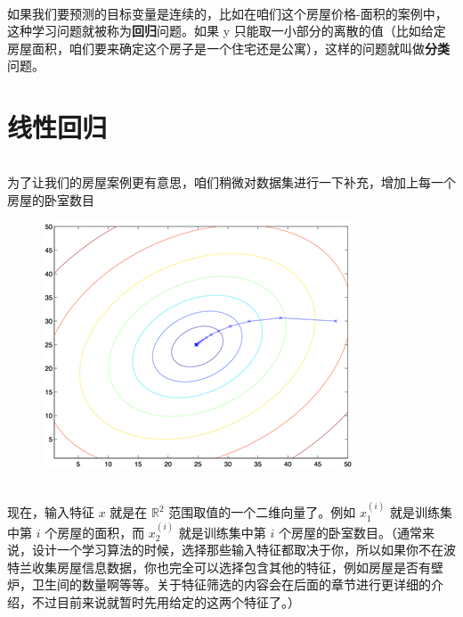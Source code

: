 \documentclass[UTF8]{ctexart}
\begin{document}
	\paragraph{}
		如果我们要预测的目标变量是连续的，比如在咱们这个房屋价格-面积的案例中，这种学习问题就被称为\textbf{回归}问题。如果 y 只能取一小部分的离散的值（比如给定房屋面积，咱们要来确定这个房子是一个住宅还是公寓），这样的问题就叫做\textbf{分类}问题。
	
	\clearpage
	
	\part{线性回归}
	
	\paragraph{}
		为了让我们的房屋案例更有意思，咱们稍微对数据集进行一下补充，增加上每一个房屋的卧室数目
	
	\begin{figure}[h]
		\centering
		\includegraphics{images/screenshot004}
	\end{figure}
	
	\paragraph{}
		现在，输入特征 $ x $ 就是在 $ \mathbb{R}^{2} $ 范围取值的一个二维向量了。例如 $x _{1}^{(i)}$ 就是训练集中第 $i$ 个房屋的面积，而 $x_{2}^{(i)}$ 就是训练集中第 $i$ 个房屋的卧室数目。（通常来说，设计一个学习算法的时候，选择那些输入特征都取决于你，所以如果你不在波特兰收集房屋信息数据，你也完全可以选择包含其他的特征，例如房屋是否有壁炉，卫生间的数量啊等等。关于特征筛选的内容会在后面的章节进行更详细的介绍，不过目前来说就暂时先用给定的这两个特征了。）
		
\end{document}
